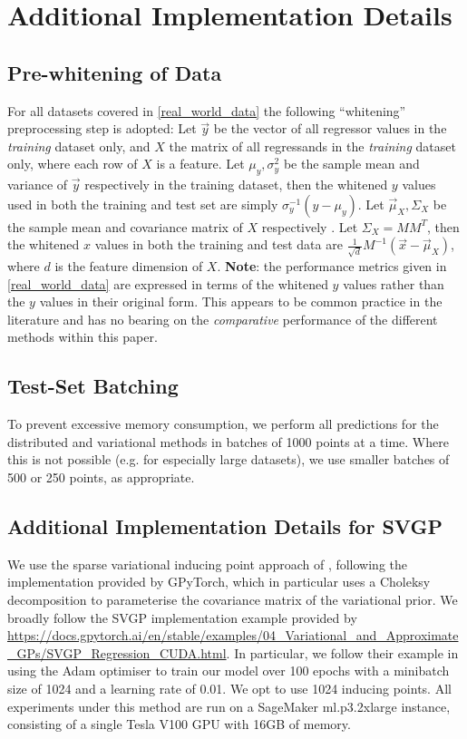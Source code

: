 \section{Additional Implementation Details}\label{appx:distrib_var}
\label{appx:more_implementational_details}
\subsection{Pre-whitening of Data}
\label{appx:prewhiten}
For all datasets covered in \autoref{real_world_data} the following ``whitening'' preprocessing step is adopted:
Let $\vec{y}$ be the vector of all regressor values in the {\it training} dataset only, and $X$ the matrix of all regressands in the {\it training} dataset only, where each row of $X$ is a feature.
Let $\mu_y, \sigma_y^2$ be the sample mean and variance of $\vec{y}$ respectively in the training dataset, then the whitened $y$ values used in both the training and test set are simply $\sigma_y^{-1}(y - \mu_y)$.
Let $\vec{\mu}_X, \Sigma_X$ be the sample mean and covariance matrix of $X$ respectively .
Let $\Sigma_X = M M^T$, then the whitened $x$ values in both the training and test data are $\frac{1}{\sqrt{d}}M^{-1}(\vec{x} - \vec{\mu}_X)$, where $d$ is the feature dimension of $X$. \textbf{Note}: the performance metrics given in \autoref{real_world_data} are expressed in terms of the whitened $y$ values rather than the $y$ values in their original form. This appears to be common practice in the literature and has no bearing on the {\it comparative} performance of the different methods within this paper.

\subsection{Test-Set Batching}
To prevent excessive memory consumption, we perform all predictions for the distributed and variational methods in batches of 1000 points at a time. Where this is not possible (e.g. for especially large datasets), we use smaller batches of 500 or 250 points, as appropriate.

\subsection{Additional Implementation Details for SVGP}
We use the sparse variational inducing point approach of \cite{Hensman}, following the implementation provided by GPyTorch, which in particular uses a Choleksy decomposition to parameterise the covariance matrix of the variational prior.
We broadly follow the SVGP implementation example provided by \url{https://docs.gpytorch.ai/en/stable/examples/04_Variational_and_Approximate_GPs/SVGP_Regression_CUDA.html}. In particular, we follow their example in using the Adam optimiser to train our model over 100 epochs with a minibatch size of 1024 and a learning rate of 0.01. We opt to use 1024 inducing points. All experiments under this method are run on a SageMaker ml.p3.2xlarge instance, consisting of a single Tesla V100 GPU with 16GB of memory.



